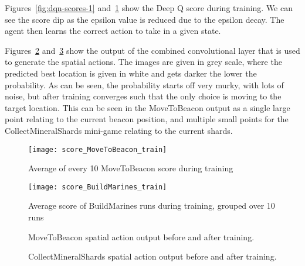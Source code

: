 Figures~\ref{fig:dqn-scores-1} and~\ref{fig:dqn-scores-2} show the Deep Q score
during training. We can see the score dip as the epsilon value is reduced due to
the epsilon decay. The agent then learns the correct action to take in a given
state.

Figures~\ref{fig:cnn-filter1} and~\ref{fig:cnn-filter2} show the output of the
combined convolutional layer that is used to generate the spatial actions. The
images are given in grey scale, where the predicted best location is given in
white and gets darker the lower the probability. As can be seen, the
probability starts off very murky, with lots of noise, but after training
converges such that the only choice is moving to the target location. This can
be seen in the MoveToBeacon output as a single large point relating to the
current beacon position, and multiple small points for the CollectMineralShards
mini-game relating to the current shards.

\begin{figure}[h]
  \centering
  \begin{minipage}[b]{0.45\textwidth}
    \texttt{[image: score\_MoveToBeacon\_train]}
    \caption{Average of every 10 MoveToBeacon score during training}%
    \label{fig:dqn-scores-1}%
  \end{minipage}
  \hfill
  \begin{minipage}[b]{0.45\textwidth}
    \texttt{[image: score\_BuildMarines\_train]}
    \caption{Average score of BuildMarines runs during training, grouped over 10
    runs}%
    \label{fig:dqn-scores-2}
  \end{minipage}
\end{figure}

\begin{figure}[h]
    \centering
    \caption{MoveToBeacon spatial action output before and after training.}%
    \label{fig:cnn-filter1}%
\end{figure}

\begin{figure}[h]
    \centering
    \caption{CollectMineralShards spatial action output before and after training.}%
    \label{fig:cnn-filter2}%
\end{figure}

